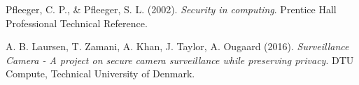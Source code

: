 
\begin{thebibliography}{9}

    Pfleeger, C. P., \& Pfleeger, S. L.
    (2002).
    \textit{Security in computing}.
    Prentice Hall Professional Technical Reference.

    A. B. Laursen, T. Zamani, A. Khan, J. Taylor, A. Ougaard
    (2016).
    \textit{Surveillance Camera - A project on secure camera
      surveillance while preserving privacy}.
    DTU Compute, Technical University of Denmark.

\end{thebibliography}
